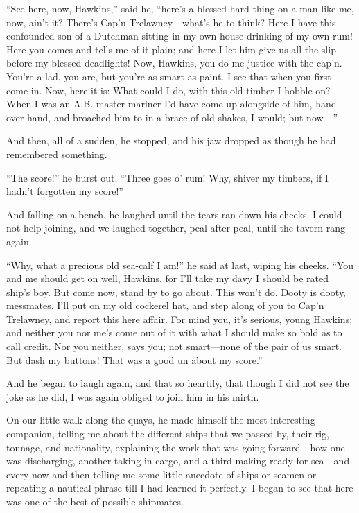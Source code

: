 \enquote{See here, now, Hawkins,} said he, \enquote{here’s a blessed hard thing on a man like me, now, ain’t it? There’s Cap’n Trelawney---what’s he to think? Here I have this confounded son of a Dutchman sitting in my own house drinking of my own rum! Here you comes and tells me of it plain; and here I let him give us all the slip before my blessed deadlights! Now, Hawkins, you do me justice with the cap’n. You’re a lad, you are, but you’re as smart as paint. I see that when you first come in. Now, here it is: What could I do, with this old timber I hobble on? When I was an A.B. master mariner I’d have come up alongside of him, hand over hand, and broached him to in a brace of old shakes, I would; but now---}

And then, all of a sudden, he stopped, and his jaw dropped as though he had remembered something.

\enquote{The score!} he burst out. \enquote{Three goes o’ rum! Why, shiver my timbers, if I hadn’t forgotten my score!}

And falling on a bench, he laughed until the tears ran down his cheeks. I could not help joining, and we laughed together, peal after peal, until the tavern rang again.

\enquote{Why, what a precious old sea-calf I am!} he said at last, wiping his cheeks. \enquote{You and me should get on well, Hawkins, for I’ll take my davy I should be rated ship’s boy. But come now, stand by to go about. This won’t do. Dooty is dooty, messmates. I’ll put on my old cockerel hat, and step along of you to Cap’n Trelawney, and report this here affair. For mind you, it’s serious, young Hawkins; and neither you nor me’s come out of it with what I should make so bold as to call credit. Nor you neither, says you; not smart---none of the pair of us smart. But dash my buttons! That was a good un about my score.}

And he began to laugh again, and that so heartily, that though I did not see the joke as he did, I was again obliged to join him in his mirth.

On our little walk along the quays, he made himself the most interesting companion, telling me about the different ships that we passed by, their rig, tonnage, and nationality, explaining the work that was going forward---how one was discharging, another taking in cargo, and a third making ready for sea---and every now and then telling me some little anecdote of ships or seamen or repeating a nautical phrase till I had learned it perfectly. I began to see that here was one of the best of possible shipmates.

